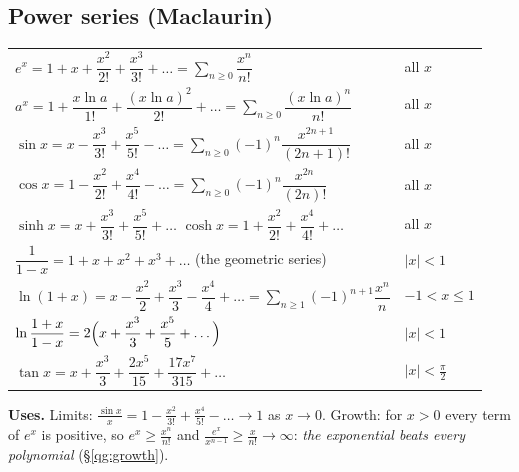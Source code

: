 \documentclass{fkt-notes}
\theoremstyle{definition}
\begin{document}
\subsection*{Power series (Maclaurin)}
%
\begin{rulepar}
  \renewcommand{\arraystretch}{1.5}
  \begin{tabular}{@{}l@{\quad}l@{}}
    $e^x=1+x+\dfrac{x^2}{2!}+\dfrac{x^3}{3!}+\dots=\displaystyle\sum_{n\ge0}\dfrac{x^n}{n!}$ & all $x$ \\
    $a^x=1+\dfrac{x\ln a}{1!}+\dfrac{(x\ln a)^2}{2!}+\dots=\displaystyle\sum_{n\ge0}\dfrac{(x\ln a)^n}{n!}$ & all $x$ \\
    $\sin x=x-\dfrac{x^3}{3!}+\dfrac{x^5}{5!}-\dots=\displaystyle\sum_{n\ge0}(-1)^n\dfrac{x^{2n+1}}{(2n+1)!}$ & all $x$ \\
    $\cos x=1-\dfrac{x^2}{2!}+\dfrac{x^4}{4!}-\dots=\displaystyle\sum_{n\ge0}(-1)^n\dfrac{x^{2n}}{(2n)!}$ & all $x$ \\
    $\sinh x=x+\dfrac{x^3}{3!}+\dfrac{x^5}{5!}+\dots$ \qquad $\cosh x=1+\dfrac{x^2}{2!}+\dfrac{x^4}{4!}+\dots$ & all $x$ \\
    $\dfrac1{1-x}=1+x+x^2+x^3+\dots$ (the geometric series) & $|x|<1$ \\
    $\ln(1+x)=x-\dfrac{x^2}2+\dfrac{x^3}3-\dfrac{x^4}4+\dots=\displaystyle\sum_{n\ge1}(-1)^{n+1}\dfrac{x^n}n$ & $-1<x\le1$ \\
    $\ln\dfrac{1+x}{1-x}=2\Bigl(x+\dfrac{x^3}3+\dfrac{x^5}5+\dots\Bigr)$ & $|x|<1$ \\
    $\tan x=x+\dfrac{x^3}3+\dfrac{2x^5}{15}+\dfrac{17x^7}{315}+\dots$ & $|x|<\frac\pi2$ \\
  \end{tabular}
\end{rulepar}
\textbf{Uses.} Limits: $\frac{\sin x}x=1-\frac{x^2}{3!}+\frac{x^4}{5!}-\dots\to1$
as $x\to0$. Growth: for $x>0$ every term of $e^x$ is positive, so
$e^x\ge\frac{x^n}{n!}$ and $\frac{e^x}{x^{n-1}}\ge\frac x{n!}\to\infty$:
\emph{the exponential beats every polynomial} (\S\ref{qg:growth}).
\end{document}

